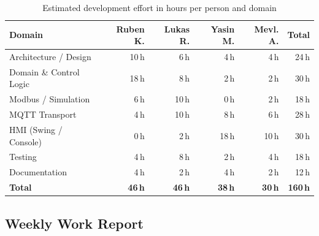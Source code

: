 \documentclass[12pt,a4paper]{article}
\begin{document}
\begin{table}[H]
\centering
\begin{tabular}{lrrrrr}
\toprule
\textbf{Domain} & \textbf{Ruben K.} & \textbf{Lukas R.} & \textbf{Yasin M.} & \textbf{Mevl. A.} & \textbf{Total} \\
\midrule
Architecture / Design   & 10\,h &  6\,h &  4\,h &  4\,h & 24\,h \\
Domain \& Control Logic & 18\,h &  8\,h &  2\,h &  2\,h & 30\,h \\
Modbus / Simulation     &  6\,h & 10\,h &  0\,h &  2\,h & 18\,h \\
MQTT Transport          &  4\,h & 10\,h &  8\,h &  6\,h & 28\,h \\
HMI (Swing / Console)   &  0\,h &  2\,h & 18\,h & 10\,h & 30\,h \\
Testing                 &  4\,h &  8\,h &  2\,h &  4\,h & 18\,h \\
Documentation           &  4\,h &  2\,h &  4\,h &  2\,h & 12\,h \\
\midrule
\textbf{Total} & \textbf{46\,h} & \textbf{46\,h} & \textbf{38\,h} & \textbf{30\,h} & \textbf{160\,h} \\
\bottomrule
\end{tabular}
\caption{Estimated development effort in hours per person and domain}
\end{table}

\subsection{Weekly Work Report}
\end{document}
